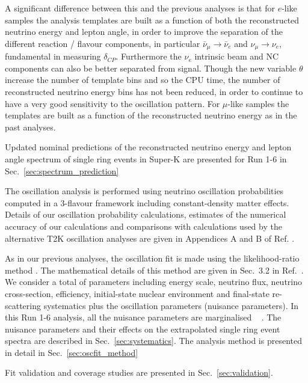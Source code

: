 A significant difference between this and the previous analyses is that
for $e$-like samples the analysis templates are built as a function of both 
the reconstructed neutrino energy and lepton angle,
in order to improve the separation of the different reaction / flavour components,
in particular $\bar{\nu}_{\mu} \rightarrow \bar{\nu}_e$ and $\nu_{\mu} \rightarrow \nu_e$,
fundamental in measuring $\delta_{CP}$.
Furthermore the $\nu_e$ intrinsic beam and NC components can also be better separated from signal.
Though the new variable $\theta$ increase the number of template bins and so the CPU time,
the number of reconstructed neutrino energy bins has not been reduced,
in order to continue to have a very good sensitivity to the oscillation pattern.
For $\mu$-like samples the templates are built as a function of the reconstructed neutrino energy
as in the past analyses.




Updated nominal predictions of the reconstructed neutrino energy and lepton angle spectrum 
of single ring events in Super-K are presented 
for Run 1-6 in Sec.~\ref{sec:spectrum_prediction}

The oscillation analysis is performed using neutrino oscillation probabilities computed in a 3-flavour
framework including constant-density matter effects. 
Details of our oscillation probability calculations, estimates of the numerical accuracy of our
calculations and comparisons with calculations used by the alternative T2K oscillation analyses 
are given in Appendices A and B of Ref. \cite{OurRun123DisappAnalysis3Flavour}.

As in our previous analyses, the oscillation fit is made using the likelihood-ratio method \cite{StatAnalysisCowan}.
The mathematical details of this method are given in Sec.\ 3.2 in Ref.\ \cite{OurRun1DisappAnalysis}.
We consider a total of \NSyst{} parameters including energy scale, neutrino flux, neutrino cross-section,
efficiency, initial-state nuclear environment and final-state re-scattering systematics 
plus the oscillation parameters (nuisance parameters).
In this Run 1-6 analysis, all the nuisance parameters are marginalised 
~ \cite{CousinsHighland}
.
The nuisance parameters and their effects 
on the extrapolated single ring event spectra are described in Sec.~\ref{sec:systematics}.
The analysis method is presented in detail in Sec.~\ref{sec:oscfit_method}

Fit validation and coverage studies are presented in Sec.~\ref{sec:validation}.


